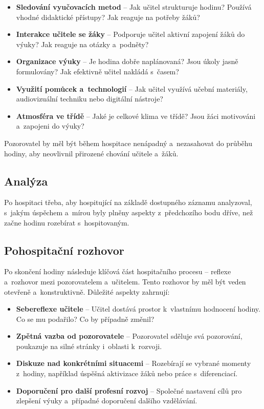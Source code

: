 \begin{itemize}
    \item \textbf{Sledování vyučovacích metod} – Jak učitel strukturuje hodinu? Používá vhodné didaktické přístupy? Jak reaguje na potřeby žáků?
    \item \textbf{Interakce učitele se žáky} – Podporuje učitel aktivní zapojení žáků do výuky? Jak reaguje na otázky a~podněty?
    \item \textbf{Organizace výuky} – Je hodina dobře naplánovaná? Jsou úkoly jasně formulovány? Jak efektivně učitel nakládá s~časem?
    \item \textbf{Využití pomůcek a~technologií} – Jak učitel využívá učební materiály, audiovizuální techniku nebo digitální nástroje?
    \item \textbf{Atmosféra ve třídě} – Jaké je celkové klima ve třídě? Jsou žáci motivováni a~zapojeni do výuky?
\end{itemize}

Pozorovatel by měl být během hospitace nenápadný a~nezasahovat do průběhu hodiny, aby neovlivnil přirozené chování učitele a~žáků.

\subsection{Analýza}
Po hospitaci třeba, aby hospitující na základě dostupného záznamu analyzoval, s~jakým úspěchem a~mírou byly plněny aspekty z~předchozího bodu dříve, než začne hodinu rozebírat s~hospitovaným.

\subsection{Pohospitační rozhovor}
    Po skončení hodiny následuje klíčová část hospitačního procesu – reflexe a~rozhovor mezi pozorovatelem a~učitelem. Tento rozhovor by měl být veden otevřeně a~konstruktivně. Důležité aspekty zahrnují:

\begin{itemize}
    \item \textbf{Sebereflexe učitele} – Učitel dostává prostor k~vlastnímu hodnocení hodiny. Co se mu podařilo? Co by případně změnil?
    \item \textbf{Zpětná vazba od pozorovatele} – Pozorovatel sděluje svá pozorování, poukazuje na silné stránky i~oblasti k~rozvoji.
    \item \textbf{Diskuze nad konkrétními situacemi} – Rozebírají se vybrané momenty z~hodiny, například úspěšná aktivizace žáků nebo práce s~diferenciací.
    \item \textbf{Doporučení pro další profesní rozvoj} – Společné nastavení cílů pro zlepšení výuky a~případné doporučení dalšího vzdělávání.
\end{itemize}

